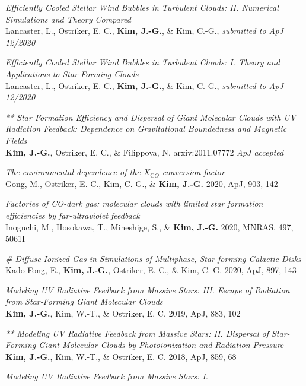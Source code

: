 \begin{benumerate}{14}
\item \textit{Efficiently Cooled Stellar Wind Bubbles in Turbulent Clouds:
II. Numerical Simulations and Theory Compared}\\
  Lancaster, L., Ostriker, E. C., \textbf{Kim, J.-G.}, \& Kim, C.-G.,
  \textit{submitted to ApJ 12/2020}
\item \textit{Efficiently Cooled Stellar Wind Bubbles in Turbulent Clouds:
I. Theory and Applications to Star-Forming Clouds}\\
  Lancaster, L., Ostriker, E. C., \textbf{Kim, J.-G.}, \& Kim, C.-G.,
  \textit{submitted to ApJ 12/2020}
\item \textit{** Star Formation Efficiency and Dispersal of Giant Molecular
    Clouds with UV Radiation Feedback: Dependence on Gravitational Boundedness
    and Magnetic Fields} \\ \textbf{Kim, J.-G.}, Ostriker, E. C., \& Filippova,
  N. arxiv:2011.07772 \textit{ApJ accepted}
\item \textit{The environmental dependence of the $X_{\mathrm CO}$ conversion
    factor}\\ Gong, M., Ostriker, E. C., Kim, C.-G., \& \textbf{Kim,
    J.-G.} 2020, ApJ, 903, 142 
\item \textit{Factories of CO-dark gas: molecular clouds with limited star
formation efficiencies by far-ultraviolet feedback} \\
  Inoguchi, M., Hosokawa, T., Mineshige, S., \& \textbf{Kim, J.-G.} 2020, MNRAS,
  497, 5061I
\item \textit{\# Diffuse Ionized Gas in Simulations of Multiphase, Star-forming
    Galactic Disks}\\
  Kado-Fong, E., \textbf{Kim, J.-G.}, Ostriker, E. C., \& Kim, C.-G. 2020, ApJ,
  897, 143
\item \textit{Modeling UV Radiative Feedback from Massive Stars: III. Escape
    of Radiation from Star-Forming Giant Molecular Clouds} \\ \textbf{Kim,
    J.-G.}, Kim, W.-T., \& Ostriker, E. C. 2019, ApJ, 883, 102
\item \textit{** Modeling UV Radiative Feedback from Massive Stars: II. Dispersal
of Star-Forming Giant Molecular Clouds by Photoionization and Radiation
Pressure} \\ \textbf{Kim, J.-G.}, Kim, W.-T., \& Ostriker, E. C. 2018, ApJ, 859,
68
\item \textit{Modeling UV Radiative Feedback from Massive Stars: I.
}
\end{benumerate}
